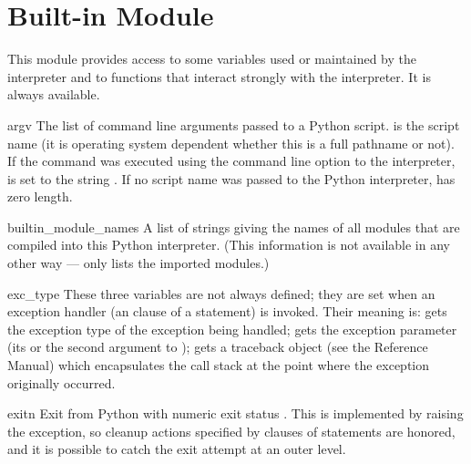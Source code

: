 \section{Built-in Module }

This module provides access to some variables used or maintained by the
interpreter and to functions that interact strongly with the interpreter.
It is always available.

\renewcommand{\indexsubitem}{(in module sys)}

\begin{datadesc}{argv}
  The list of command line arguments passed to a Python script.
   is the script name (it is operating system
  dependent whether this is a full pathname or not).
  If the command was executed using the  command line option
  to the interpreter,  is set to the string
  .
  If no script name was passed to the Python interpreter,
   has zero length.
\end{datadesc}

\begin{datadesc}{builtin_module_names}
  A list of strings giving the names of all modules that are compiled
  into this Python interpreter.  (This information is not available in
  any other way ---  only lists the imported
  modules.)
\end{datadesc}

\begin{datadesc}{exc_type}
  These three variables are not always defined; they are set when an
  exception handler (an  clause of a  statement) is
  invoked.  Their meaning is:  gets the exception type of
  the exception being handled;  gets the exception
  parameter (its  or the second argument to
  );  gets a traceback object (see the
  Reference Manual) which
  encapsulates the call stack at the point where the exception
  originally occurred.
\end{datadesc}

\begin{funcdesc}{exit}{n}
  Exit from Python with numeric exit status .  This is
  implemented by raising the  exception, so cleanup
  actions specified by  clauses of  statements
  are honored, and it is possible to catch the exit attempt at an outer
  level.
\end{funcdesc}

